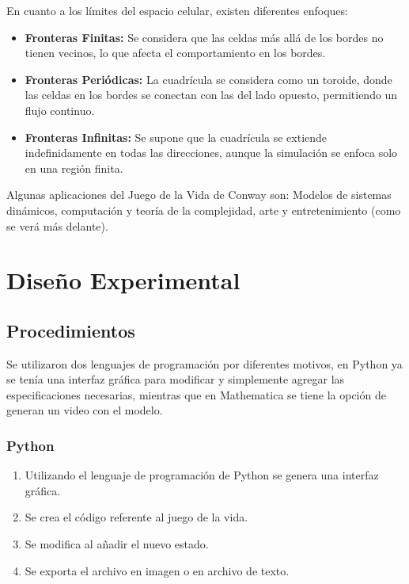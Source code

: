 \documentclass[conference]{IEEEtran}
\begin{document}
En cuanto a los límites del espacio celular, existen diferentes enfoques:

\begin{itemize}
	\item \textbf{Fronteras Finitas: }Se considera que las celdas más allá de los bordes no tienen vecinos, lo que afecta el comportamiento en los bordes.
	\item \textbf{Fronteras Periódicas:} La cuadrícula se considera como un toroide, donde las celdas en los bordes se conectan con las del lado opuesto, permitiendo un flujo continuo.
	\item \textbf{Fronteras Infinitas:} Se supone que la cuadrícula se extiende indefinidamente en todas las direcciones, aunque la simulación se enfoca solo en una región finita.
\end{itemize}

Algunas aplicaciones del Juego de la Vida de Conway son: Modelos de sistemas dinámicos, computación y teoría de la complejidad, arte y entretenimiento (como se verá más delante).
    
    
\section{Diseño Experimental}

    \subsection{Procedimientos}
    
		Se utilizaron dos lenguajes de programación por diferentes motivos, en Python ya se tenía una interfaz gráfica para modificar y simplemente agregar las especificaciones necesarias, mientras que en Mathematica se tiene la opción de generan un video con el modelo.    	
    	
    \subsubsection{Python}
        \begin{enumerate}
            \item Utilizando el lenguaje de programación de Python se genera una interfaz gráfica.
            \item Se crea el código referente al juego de la vida.
            \item Se modifica al añadir el nuevo estado.
            \item Se exporta el archivo en imagen o en archivo de texto.
        \end{enumerate}
        
\end{document}

